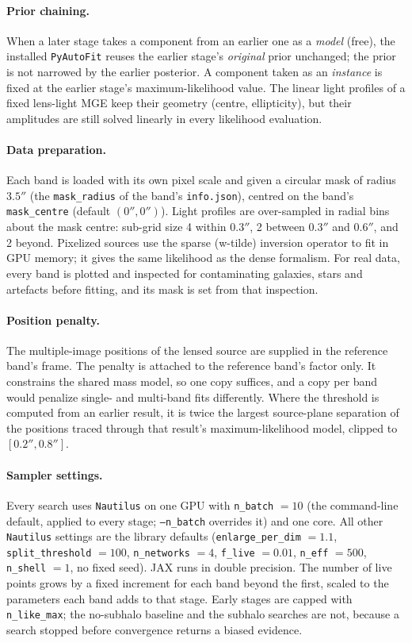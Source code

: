 \paragraph{Prior chaining.} When a later stage takes a component from an earlier one as a
\emph{model} (free), the installed \texttt{PyAutoFit} reuses the earlier stage's \emph{original}
prior unchanged; the prior is not narrowed by the earlier posterior. A component taken as an
\emph{instance} is fixed at the earlier stage's maximum-likelihood value. The linear light profiles
of a fixed lens-light MGE keep their geometry (centre, ellipticity), but their amplitudes are still
solved linearly in every likelihood evaluation.

\paragraph{Data preparation.} Each band is loaded with its own pixel scale and given a circular mask
of radius $3.5''$ (the \texttt{mask\_radius} of the band's \texttt{info.json}), centred on the
band's \texttt{mask\_centre} (default $(0'', 0'')$). Light profiles are over-sampled in radial bins
about the mask centre: sub-grid size 4 within $0.3''$, 2 between $0.3''$ and $0.6''$, and 2 beyond.
Pixelized sources use the sparse (w-tilde) inversion operator to fit in GPU memory; it gives the same
likelihood as the dense formalism. For real data, every band is plotted and inspected for
contaminating galaxies, stars and artefacts before fitting, and its mask is set from that inspection.

\paragraph{Position penalty.} The multiple-image positions of the lensed source are supplied in the
reference band's frame. The penalty is attached to the reference band's factor only. It constrains
the shared mass model, so one copy suffices, and a copy per band would penalize single- and
multi-band fits differently. Where the threshold is computed from an earlier result, it is twice the
largest source-plane separation of the positions traced through that result's maximum-likelihood
model, clipped to $[0.2'', 0.8'']$.

\paragraph{Sampler settings.} Every search uses \texttt{Nautilus} on one GPU with
\texttt{n\_batch} $= 10$ (the command-line default, applied to every stage; \texttt{--n\_batch}
overrides it) and one core. All other \texttt{Nautilus} settings are the library defaults
(\texttt{enlarge\_per\_dim} $= 1.1$, \texttt{split\_threshold} $= 100$, \texttt{n\_networks} $= 4$,
\texttt{f\_live} $= 0.01$, \texttt{n\_eff} $= 500$, \texttt{n\_shell} $= 1$, no fixed seed).
JAX runs in double precision. The number of live points grows by a fixed increment for each band
beyond the first, scaled to the parameters each band adds to that stage. Early stages are capped with
\texttt{n\_like\_max}; the no-subhalo baseline and the subhalo searches are not, because a search
stopped before convergence returns a biased evidence.

